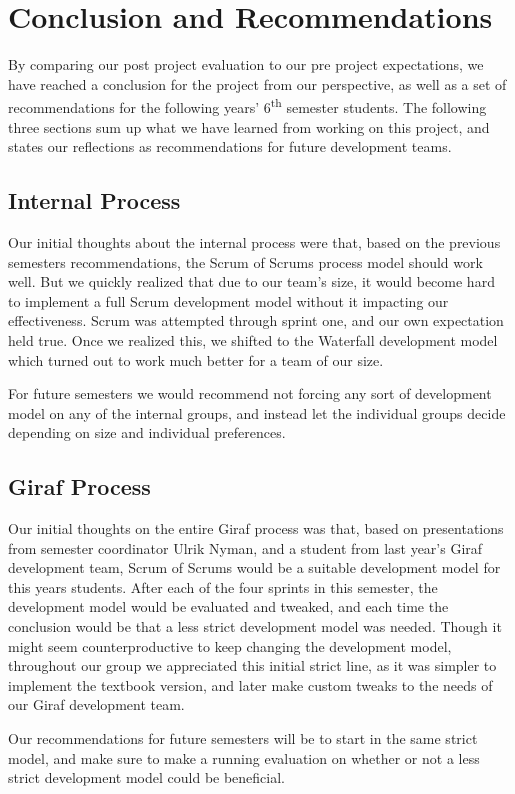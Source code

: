 \chapter{Conclusion and Recommendations}
By comparing our post project evaluation to our pre project expectations, we have reached a conclusion for the project from our perspective, as well as a set of recommendations for the following years' 6\textsuperscript{th} semester students.
The following three sections sum up what we have learned from working on this project, and states our reflections as recommendations for future development teams.

\section{Internal Process}
Our initial thoughts about the internal process were that, based on the previous semesters recommendations, the Scrum of Scrums process model should work well.
But we quickly realized that due to our team's size, it would become hard to implement a full Scrum development model without it impacting our effectiveness.
Scrum was attempted through sprint one, and our own expectation held true.
Once we realized this, we shifted to the Waterfall development model which turned out to work much better for a team of our size.

For future semesters we would recommend not forcing any sort of development model on any of the internal groups, and instead let the individual groups decide depending on size and individual preferences.

\section{Giraf Process}
Our initial thoughts on the entire Giraf process was that, based on presentations from semester coordinator Ulrik Nyman, and a student from last year's Giraf development team, Scrum of Scrums would be a suitable development model for this years students.
After each of the four sprints in this semester, the development model would be evaluated and tweaked, and each time the conclusion would be that a less strict development model was needed.
Though it might seem counterproductive to keep changing the development model, throughout our group we appreciated this initial strict line, as it was simpler to implement the textbook version, and later make custom tweaks to the needs of our Giraf development team.

Our recommendations for future semesters will be to start in the same strict model, and make sure to make a running evaluation on whether or not a less strict development model could be beneficial.

